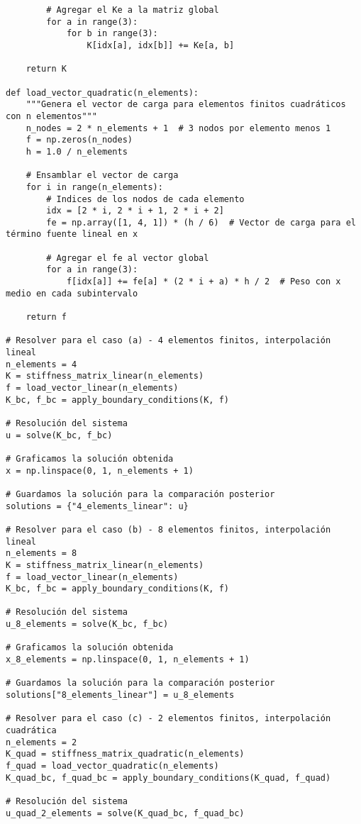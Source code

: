 \begin{verbatim}
        # Agregar el Ke a la matriz global
        for a in range(3):
            for b in range(3):
                K[idx[a], idx[b]] += Ke[a, b]

    return K

def load_vector_quadratic(n_elements):
    """Genera el vector de carga para elementos finitos cuadráticos con n elementos"""
    n_nodes = 2 * n_elements + 1  # 3 nodos por elemento menos 1
    f = np.zeros(n_nodes)
    h = 1.0 / n_elements

    # Ensamblar el vector de carga
    for i in range(n_elements):
        # Indices de los nodos de cada elemento
        idx = [2 * i, 2 * i + 1, 2 * i + 2]
        fe = np.array([1, 4, 1]) * (h / 6)  # Vector de carga para el término fuente lineal en x

        # Agregar el fe al vector global
        for a in range(3):
            f[idx[a]] += fe[a] * (2 * i + a) * h / 2  # Peso con x medio en cada subintervalo

    return f

# Resolver para el caso (a) - 4 elementos finitos, interpolación lineal
n_elements = 4
K = stiffness_matrix_linear(n_elements)
f = load_vector_linear(n_elements)
K_bc, f_bc = apply_boundary_conditions(K, f)

# Resolución del sistema
u = solve(K_bc, f_bc)

# Graficamos la solución obtenida
x = np.linspace(0, 1, n_elements + 1)

# Guardamos la solución para la comparación posterior
solutions = {"4_elements_linear": u}

# Resolver para el caso (b) - 8 elementos finitos, interpolación lineal
n_elements = 8
K = stiffness_matrix_linear(n_elements)
f = load_vector_linear(n_elements)
K_bc, f_bc = apply_boundary_conditions(K, f)

# Resolución del sistema
u_8_elements = solve(K_bc, f_bc)

# Graficamos la solución obtenida
x_8_elements = np.linspace(0, 1, n_elements + 1)

# Guardamos la solución para la comparación posterior
solutions["8_elements_linear"] = u_8_elements

# Resolver para el caso (c) - 2 elementos finitos, interpolación cuadrática
n_elements = 2
K_quad = stiffness_matrix_quadratic(n_elements)
f_quad = load_vector_quadratic(n_elements)
K_quad_bc, f_quad_bc = apply_boundary_conditions(K_quad, f_quad)

# Resolución del sistema
u_quad_2_elements = solve(K_quad_bc, f_quad_bc)


\end{verbatim}
